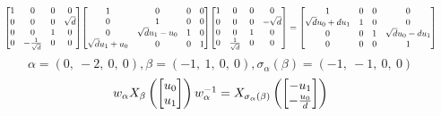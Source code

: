 \documentclass[11pt]{article}
\theoremstyle{definition}
\begin{document}
\[
\scaletoalign{\textwidth}{{\left[\begin{matrix}1 & 0 & 0 & 0\\0 & 0 & 0 & \sqrt{d}\\0 & 0 & 1 & 0\\0 & - \frac{1}{\sqrt{d}} & 0 & 0\end{matrix}\right]} {\left[\begin{matrix}1 & 0 & 0 & 0\\0 & 1 & 0 & 0\\0 & \sqrt{d} u_{1} - u_{0} & 1 & 0\\\sqrt{d} u_{1} + u_{0} & 0 & 0 & 1\end{matrix}\right]} {\left[\begin{matrix}1 & 0 & 0 & 0\\0 & 0 & 0 & - \sqrt{d}\\0 & 0 & 1 & 0\\0 & \frac{1}{\sqrt{d}} & 0 & 0\end{matrix}\right]} = {\left[\begin{matrix}1 & 0 & 0 & 0\\\sqrt{d} u_{0} + d u_{1} & 1 & 0 & 0\\0 & 0 & 1 & \sqrt{d} u_{0} - d u_{1}\\0 & 0 & 0 & 1\end{matrix}\right]}}
\]
\[
\alpha = \left( 0, \  -2, \  0, \  0\right), \beta = \left( -1, \  1, \  0, \  0\right), \sigma_{\alpha}(\beta) = \left( -1, \  -1, \  0, \  0\right)
\]
\[
\scaletoalign{\textwidth}{w_{\alpha} X_{\beta}\left(\left[\begin{matrix}u_{0}\\u_{1}\end{matrix}\right]\right) w_{\alpha}^{-1} = X_{\sigma_{\alpha}\left(\beta\right)}\left(\left[\begin{matrix}- u_{1}\\- \frac{u_{0}}{d}\end{matrix}\right]\right)}
\]
\end{document}
